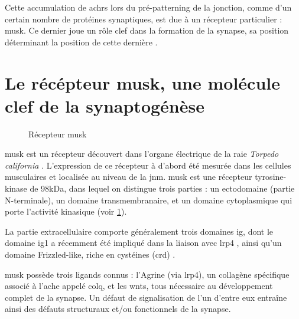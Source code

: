 	Cette accumulation de \glspl{achr} lors du pré-patterning de la jonction, comme d'un certain nombre de protéines synaptiques, est due à un récepteur particulier : \gls{musk}. Ce dernier joue un rôle clef dans la formation de la synapse, sa position déterminant la position de cette dernière \cite{DeChiara1996, Glass1996}.
	
\section{Le récépteur \acrshort{musk}, une molécule clef de la synaptogénèse}
\label{sec:IntroMuSK}	
	\begin{figure}
		\caption{Récepteur \gls{musk}}
		\label{fig:RMuSK}
	\end{figure}
	
	\acrfull{musk} est un récepteur découvert dans l'organe électrique de la raie \emph{Torpedo california} \cite{Jennings1993}. L'expression de ce récepteur à d'abord été mesurée dans les cellules musculaires et localisée au niveau de la \gls{jnm}. \gls{musk} est une récepteur tyrosine-kinase de 98kDa, dans lequel on distingue trois parties : un ectodomaine (partie N-terminale), un domaine transmembranaire, et un domaine cytoplasmique qui porte l'activité kinasique (voir \cref{fig:RMuSK}). 
	
	La partie extracellulaire comporte généralement trois domaines \gls{ig}, dont le domaine \gls{ig}1 a récemment été impliqué dans la liaison avec \gls{lrp}4 \cite{Zhang2011}, ainsi qu'un domaine Frizzled-like, riche en cystéines (\gls{crd}) \cite{Jing2009}.
	
	\gls{musk} possède trois ligands connus : l'Agrine (via \acrshort{lrp}4), un collagène spécifique associé à l'\Gls{ache} appelé \acrshort{colq}, et les \Glspl{wnt}, tous nécessaire au développement complet de la synapse. Un défaut de signalisation de l'un d'entre eux entraîne ainsi des défauts structuraux et/ou fonctionnels de la synapse.
	
